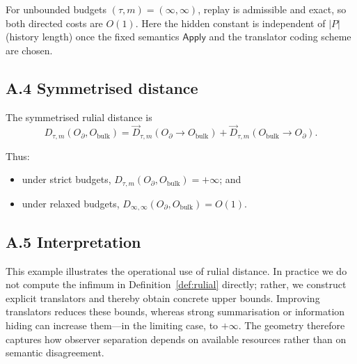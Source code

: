 \documentclass{aion}
\newcommand{\Apply}{\mathsf{Apply}}
\begin{document}
For unbounded budgets $(\tau,m)=(\infty,\infty)$, replay is admissible and exact, so both directed
costs are $O(1)$.
Here the hidden constant is independent of $|P|$ (history length) once the fixed semantics $\Apply$ and the translator coding scheme are chosen.

\subsection*{A.4 Symmetrised distance}

The symmetrised rulial distance is
\[
D_{\tau,m}(O_\partial,O_{\mathrm{bulk}})
= \vec{D}_{\tau,m}(O_\partial \to O_{\mathrm{bulk}})
+ \vec{D}_{\tau,m}(O_{\mathrm{bulk}} \to O_\partial).
\]

Thus:
\begin{itemize}
\item under strict budgets,
$D_{\tau,m}(O_\partial,O_{\mathrm{bulk}})=+\infty$; and
\item under relaxed budgets,
$D_{\infty,\infty}(O_\partial,O_{\mathrm{bulk}})=O(1)$.
\end{itemize}

\subsection*{A.5 Interpretation}

This example illustrates the operational use of rulial distance. In practice we do not compute the
infimum in Definition~\ref{def:rulial} directly; rather, we construct explicit translators and thereby obtain
concrete upper bounds. Improving translators reduces these bounds, whereas strong summarisation
or information hiding can increase them---in the limiting case, to $+\infty$. The geometry therefore captures
how observer separation depends on available resources rather than on semantic disagreement.

\clearpage
{}


\end{document}
